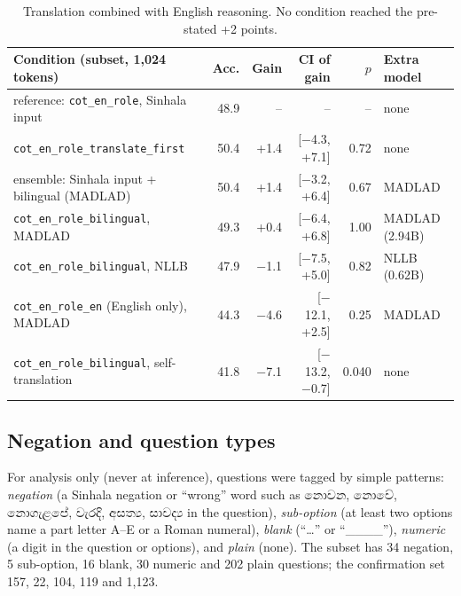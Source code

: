 \documentclass[10pt,a4paper]{article}
\newcommand{\si}[1]{{\sinhalafont #1}}
\newcommand{\cond}[1]{\texttt{#1}}
\begin{document}
\begin{table}[h]
\centering\footnotesize\setlength{\tabcolsep}{4pt}
\begin{tabular}{lrrrrl}
\toprule
Condition (subset, 1,024 tokens) & Acc. & Gain & CI of gain & $p$ & Extra model\\
\midrule
reference: \cond{cot\_en\_role}, Sinhala input & 48.9 & -- & -- & -- & none\\
\cond{cot\_en\_role\_translate\_first} & 50.4 & +1.4 & [$-$4.3, +7.1] & 0.72 & none\\
ensemble: Sinhala input + bilingual (MADLAD) & 50.4 & +1.4 & [$-$3.2, +6.4] & 0.67 & MADLAD\\
\cond{cot\_en\_role\_bilingual}, MADLAD & 49.3 & +0.4 & [$-$6.4, +6.8] & 1.00 & MADLAD (2.94B)\\
\cond{cot\_en\_role\_bilingual}, NLLB & 47.9 & $-$1.1 & [$-$7.5, +5.0] & 0.82 & NLLB (0.62B)\\
\cond{cot\_en\_role\_en} (English only), MADLAD & 44.3 & $-$4.6 & [$-$12.1, +2.5] & 0.25 & MADLAD\\
\cond{cot\_en\_role\_bilingual}, self-translation & 41.8 & $-$7.1 & [$-$13.2, $-$0.7] & 0.040 & none\\
\bottomrule
\end{tabular}
\caption{Translation combined with English reasoning. No condition reached the pre-stated +2 points.}
\label{tab:transcot}
\end{table}

\subsection{Negation and question types}\label{sec:negation}
For analysis only (never at inference), questions were tagged by simple patterns: \emph{negation} (a Sinhala negation
or ``wrong'' word such as \si{නොවන}, \si{නොවේ}, \si{නොගැළපේ}, \si{වැරදි}, \si{අසත්‍ය}, \si{සාවද්‍ය} in the question),
\emph{sub-option} (at least two options name a part letter A--E or a Roman numeral), \emph{blank} (``\ldots'' or
``\_\_\_\_''), \emph{numeric} (a digit in the question or options), and \emph{plain} (none). The subset has 34 negation,
5 sub-option, 16 blank, 30 numeric and 202 plain questions; the confirmation set 157, 22, 104, 119 and 1,123.
\end{document}
